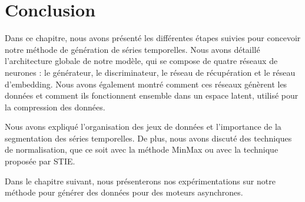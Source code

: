 \section{Conclusion}
Dans ce chapitre, nous avons présenté les différentes étapes suivies pour concevoir notre méthode de génération de séries temporelles. Nous avons détaillé l'architecture globale de notre modèle, qui se compose de quatre réseaux de neurones : le générateur, le discriminateur, le réseau de récupération et le réseau d'embedding. Nous avons également montré comment ces réseaux génèrent les données et comment ils fonctionnent ensemble dans un espace latent, utilisé pour la compression des données.

Nous avons expliqué l'organisation des jeux de données et l'importance de la segmentation des séries temporelles. De plus, nous avons discuté des techniques de normalisation, que ce soit avec la méthode MinMax ou avec la technique proposée par STIE.

Dans le chapitre suivant, nous présenterons nos expérimentations sur notre méthode pour générer des données pour des moteurs asynchrones.
